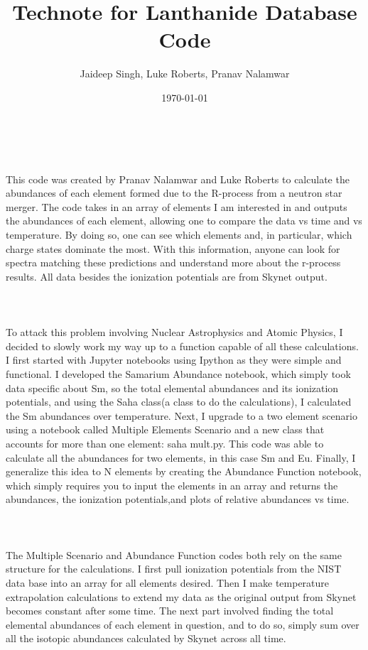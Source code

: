 \documentclass[11pt,a4paper]{article}
\begin{document}
\title{Technote for Lanthanide Database Code}
\author{Jaideep Singh, Luke Roberts, Pranav Nalamwar}
\date{\today}
\maketitle

\\\\
This code was created by Pranav Nalamwar and Luke Roberts to calculate the abundances of each element formed due to the R-process from a neutron star merger. The code takes in an array of elements I am interested in and outputs the abundances of each element, allowing one to compare the data vs time and vs temperature. By doing so, one can see which elements and, in particular, which charge states dominate the most. With this information, anyone can look for spectra matching these predictions and understand more about the r-process results. All data besides the ionization potentials are from Skynet output.
\\\\
\\\\
To attack this problem involving Nuclear Astrophysics and Atomic Physics, I decided to slowly work my way up to a function capable of all these calculations. I first started with Jupyter notebooks using Ipython as they were simple and functional. I developed the Samarium Abundance notebook, which simply took data specific about Sm, so the total elemental abundances and its ionization potentials, and using the Saha class(a class to do the calculations), I calculated the Sm abundances over temperature. Next, I upgrade to a two element scenario using a notebook called Multiple Elements Scenario and a new class that accounts for more than one element: saha mult.py. This code was able to calculate all the abundances for two elements, in this case Sm and Eu. Finally, I generalize this idea to N elements by creating the Abundance Function notebook, which simply requires you to input the elements in an array and returns the abundances, the ionization potentials,and plots of relative abundances vs time.
\\\\
\\\\
The Multiple Scenario and Abundance Function codes both rely on the same structure for the calculations. I first pull ionization potentials from the NIST data base into an array for all elements desired. Then I make temperature extrapolation calculations to extend my data as the original output from Skynet becomes constant after some time. The next part involved finding the total elemental abundances of each element in question, and to do so, simply sum over all the isotopic abundances calculated by Skynet across all time.
\end{document}
